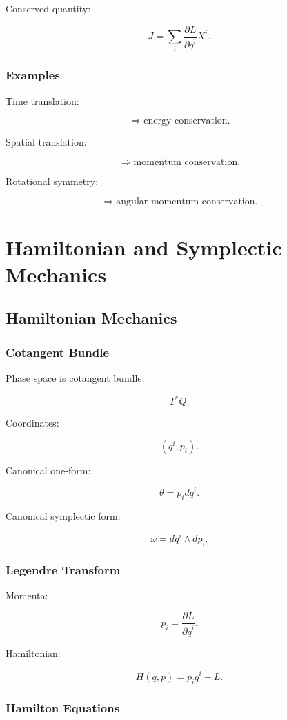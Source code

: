 \documentclass[11pt]{book}
\begin{document}
Conserved quantity:

\[
J
=
\sum_i
\frac{\partial L}{\partial \dot q^i}
X^i.
\]

\section{Examples}

Time translation:

\[
\Rightarrow
\text{energy conservation}.
\]

Spatial translation:

\[
\Rightarrow
\text{momentum conservation}.
\]

Rotational symmetry:

\[
\Rightarrow
\text{angular momentum conservation}.
\]

\part{Hamiltonian and Symplectic Mechanics}

\chapter{Hamiltonian Mechanics}

\section{Cotangent Bundle}

Phase space is cotangent bundle:

\[
T^*Q.
\]

Coordinates:

\[
(q^i,p_i).
\]

Canonical one-form:

\[
\theta
=
p_i dq^i.
\]

Canonical symplectic form:

\[
\omega
=
dq^i\wedge dp_i.
\]

\section{Legendre Transform}

Momenta:

\[
p_i
=
\frac{\partial L}{\partial \dot q^i}.
\]

Hamiltonian:

\[
H(q,p)
=
p_i\dot q^i-L.
\]

\section{Hamilton Equations}
\end{document}
